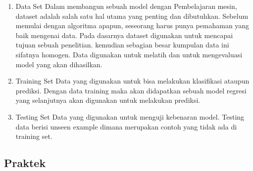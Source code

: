 \begin{enumerate}
\item{Data Set}
Dalam membangun sebuah model dengan Pembelajaran mesin, dataset  adalah salah satu hal utama yang penting dan dibutuhkan. Sebelum memulai dengan algoritma apapun, seseorang harus punya pemahaman yang baik mengenai data. Pada dasarnya dataset digunakan untuk mencapai tujuan sebuah penelitian. kemudian sebagian besar kumpulan data ini sifatnya homogen. Data digunakan untuk melatih dan untuk mengevaluasi model yang akan dihasilkan.

\item{Training Set}
Data yang digunakan untuk bisa melakukan klasifikasi ataupun prediksi. Dengan data training maka akan didapatkan sebuah model regresi yang selanjutnya akan digunakan untuk melakukan prediksi.

\item{Testing Set}
Data yang digunakan untuk menguji kebenaran model. Testing data berisi unseen example dimana merupakan contoh yang tidak ada di training set.
	\end{enumerate}
	
\subsection{Praktek}
